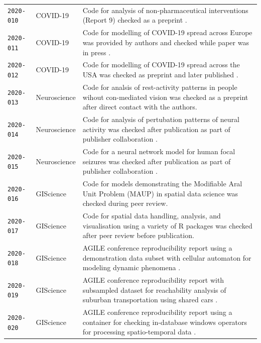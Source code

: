 \documentclass[12pt]{article}
\begin{document}
\begin{table}
\begin{tabular}{llp{12cm}}
    \texttt{2020-010}  \cite{cert-2020-010} & COVID-19 & Code for analysis of non-pharmaceutical interventions (Report 9) checked as a preprint \cite{ferguson_report_2020}. \\ %
    \texttt{2020-011}  \cite{cert-2020-011} & COVID-19 & Code for modelling of COVID-19 spread across Europe was provided by authors and checked while paper was in press \cite{flaxman_estimating_2020}. \\
    \texttt{2020-012}  \cite{cert-2020-012} & COVID-19 & Code for modelling of COVID-19 spread across the USA was checked as preprint \cite{unwin_report_2020} and later published \cite{unwin_state-level_2020}. \\
    \texttt{2020-013}  \cite{cert-2020-013} & Neuroscience & Code for analsis of rest-activity patterns in people wihout con-mediated vision was checked as a preprint \cite{Spitschan2020.06.02.129502} after direct contact with the authors. \\ %
    \texttt{2020-014}  \cite{cert-2020-014} & Neuroscience & Code for analysis of pertubation patterns of neural activity was checked after publication as part of publisher collaboration \cite{Sadeh2020}. \\ %
    \texttt{2020-015}  \cite{cert-2020-015} & Neuroscience & Code for a neural network model for human focal seizures was checked after publication as part of publisher collaboration \cite{Liou2020}. \\ %
    \texttt{2020-016}  \cite{cert-2020-016} & GIScience & Code for models demonstrating the Modifiable Aral Unit Problem (MAUP) in spatial data science \cite{Brunsdon2020} was checked during peer review. \\ %
    \texttt{2020-017}  \cite{cert-2020-017} & GIScience & Code for spatial data handling, analysis, and visualisation using a variety of R packages \cite{Bivand2020} was checked after peer review before publication. \\ %
    \texttt{2020-018}  \cite{cert-2020-018} & GIScience & AGILE conference reproducibility report using a demonstration data subset with cellular automaton for modeling dynamic phenomena \cite{Hojati2020}. \\ %
    \texttt{2020-019}  \cite{cert-2020-019} & GIScience & AGILE conference reproducibility report with subsampled dataset for reachability analysis of suburban transportation using shared cars \cite{Illium2020}. \\
    \texttt{2020-020}  \cite{cert-2020-020} & GIScience & AGILE conference reproducibility report using a container for checking in-database windows operators for processing spatio-temporal data \cite{Werner2020}. \\ %

\end{tabular}
\end{table}
\end{document}
